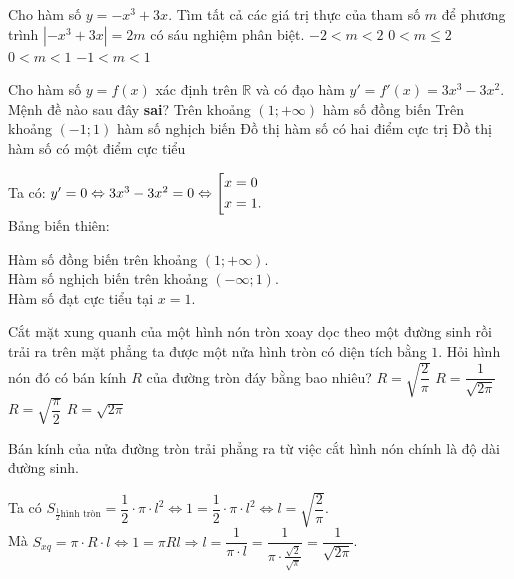 \begin{ex}%
 Cho hàm số $y = -x^3 + 3x$. Tìm tất cả các giá trị thực của tham số $m$ để phương trình $\left| -x^3 + 3x\right| = 2m$ có sáu nghiệm phân biệt.
 \choice
  {$-2 < m <2$}
  {$0 < m \leq 2$}
  {\True $0 < m < 1$}
  {$-1 < m < 1$}
 \loigiai
  {
  
  }
\end{ex}


\begin{ex}%
 Cho hàm số $y = f(x)$ xác định trên $\mathbb{R}$ và có đạo hàm $y' = f'(x) = 3x^3 - 3x^2$. Mệnh đề nào sau đây \textbf{sai}?
 \choice
  {Trên khoảng $(1;+\infty)$ hàm số đồng biến}
  {Trên khoảng $(-1;1)$ hàm số nghịch biến}
  {\True Đồ thị hàm số có hai điểm cực trị}
  {Đồ thị hàm số có một điểm cực tiểu}
 \loigiai
  {
  Ta có: $y' = 0 \Leftrightarrow 3x^3 - 3x^2 = 0 \Leftrightarrow \left[\begin{aligned}& x = 0 \\& x = 1.\end{aligned}\right.$\\
  Bảng biến thiên:
   \begin{center}
  \end{center}
  Hàm số đồng biến trên khoảng $(1;+\infty)$.\\
  Hàm số nghịch biến trên khoảng $(-\infty;1)$.\\
  Hàm số đạt cực tiểu tại $x = 1$.
  }
\end{ex}


\begin{ex}%
 Cắt mặt xung quanh của một hình nón tròn xoay dọc theo một đường sinh rồi trải ra trên mặt phẳng ta được một nửa hình tròn có diện tích bằng $1$. Hỏi hình nón đó có bán kính $R$ của đường tròn đáy bằng bao nhiêu?
 \choice
  {$R = \sqrt{\dfrac{2}{\pi}}$}
  {\True $R = \dfrac{1}{\sqrt{2\pi}}$}
  {$R = \sqrt{\dfrac{\pi}{2}}$}
  {$R = \sqrt{2\pi}$}
 \loigiai
  {
  Bán kính của nửa đường tròn trải phẳng ra từ việc cắt hình nón chính là độ dài đường sinh.
  
  Ta có $S_{\frac{1}{2}\text{hình tròn}}=\dfrac{1}{2}\cdot\pi\cdot l^2\Leftrightarrow 1=\dfrac{1}{2}\cdot\pi\cdot l^2\Leftrightarrow l=\sqrt{\dfrac{2}{\pi}}$.\\
  Mà $S_{xq}=\pi\cdot R\cdot l\Leftrightarrow 1=\pi R l\Rightarrow l=\dfrac{1}{\pi\cdot l}=\dfrac{1}{\pi\cdot\frac{\sqrt{2}}{\sqrt{\pi}}}=\dfrac{1}{\sqrt{2\pi}}$.
  }
\end{ex}


